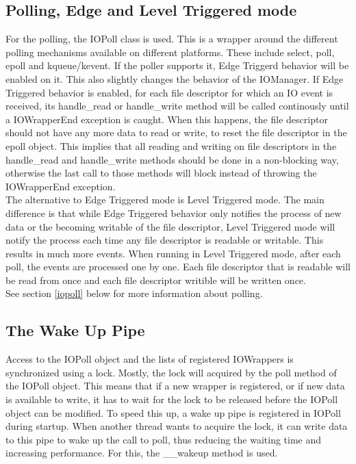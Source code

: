 \documentclass[a4paper, 10pt, oneside]{article}
\begin{document}
\subsection{Polling, Edge and Level Triggered mode}
For the polling, the IOPoll class is used. This is a wrapper around the
different polling mechanisms available on different platforms. These include
select, poll, epoll and kqueue/kevent. If the poller supports it, Edge Triggerd
behavior will be enabled on it. This also slightly changes the behavior of the
IOManager. If Edge Triggered behavior is enabled, for each file descriptor for
which an IO event is received, its handle\_read or handle\_write method will be
called continously until a IOWrapperEnd exception is caught. When this happens,
the file descriptor should not have any more data to read or write, to reset the
file descriptor in the epoll object. This implies that all reading and writing
on file descriptors in the handle\_read and handle\_write methods should be done
in a non-blocking way, otherwise the last call to those methods will block
instead of throwing the IOWrapperEnd exception. \\

The alternative to Edge Triggered mode is Level Triggered mode. The main
difference is that while Edge Triggered behavior only notifies the process of
new data or the becoming writable of the file descriptor, Level Triggered mode
will notify the process each time any file descriptor is readable or writable.
This results in much more events. When running in Level Triggered mode, after
each poll, the events are processed one by one. Each file descriptor that is
readable will be read from once and each file descriptor writible will be written
once. \\

See section \ref{iopoll} below for more information about polling.

\subsection{The Wake Up Pipe}
Access to the IOPoll object and the lists of registered IOWrappers is
synchronized using a lock. Mostly, the lock will acquired by the poll method of
the IOPoll object. This means that if a new wrapper is registered, or if new
data is available to write, it has to wait for the lock to be released before
the IOPoll object can be modified. To speed this up, a wake up pipe is
registered in IOPoll during startup. When another thread wants to acquire the
lock, it can write data to this pipe to wake up the call to poll, thus reducing
the waiting time and increasing performance. For this, the \_\_wakeup method is
used.
\end{document}
